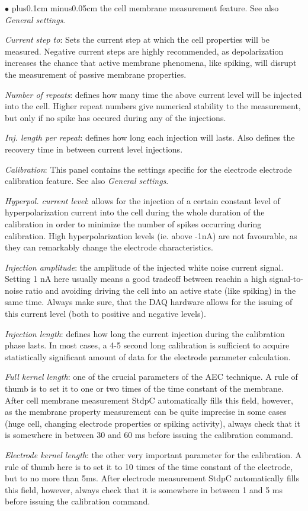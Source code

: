 \documentclass{article}
\newenvironment{myitem}{\begin{list}{$\bullet$}{\setlength{\leftmargin}{1.1em}
\itemsep0.1cm plus0.1cm minus0.05cm
\listparindent0cm
\addtolength{\labelsep}{0.5\labelsep}
\setlength{\labelwidth}{0.8em}
\setlength{\leftmargin}{\labelwidth}
\addtolength{\leftmargin}{\labelsep}
}}{\end{list}}
\begin{document}
\begin{myitem}
  the cell membrane measurement feature. See also \emph{General settings}. 
\item \emph{Current step to}: Sets the current step at which the cell
  properties will be measured. Negative current steps are highly
  recommended, as depolarization increases the chance that active membrane
  phenomena, like spiking, will disrupt the measurement of passive membrane
  properties. 
\item \emph{Number of repeats}: defines how many time the above current level
  will be injected into the cell. Higher repeat numbers give numerical
  stability to the measurement, but only if no spike has occured during any
  of the injections. 
\item \emph{Inj. length per repeat}: defines how long each injection will
  lasts. Also defines the recovery time in between current level injections. 
\item \emph{Calibration}: This panel contains the settings specific for
  the electrode electrode calibration feature. See also \emph{General
    settings}.
\item \emph{Hyperpol. current level}: allows for the injection of a certain
  constant level of  hyperpolarization current into the cell during the
  whole duration of the calibration in order to minimize the number of
  spikes occurring during calibration. High hyperpolarization levels
  (ie. above -1nA) are not favourable, as they can remarkably change the electrode 
  characteristics.
\item \emph{Injection amplitude}: the amplitude of the injected
  white noise current signal. Setting 1 nA here usually means a good
  tradeoff between reachin a high signal-to-noise ratio and avoiding
  driving the cell into 
  an active state (like spiking) in the same time. Always make sure, that
  the DAQ hardware allows for the issuing of this current level (both to
  positive and negative levels).
\item \emph{Injection length}: defines how long the current injection during
  the calibration phase lasts. In most cases, a 4-5 second long calibration
  is sufficient to acquire statistically significant amount of data for the
  electrode parameter calculation.   
\item \emph{Full kernel length}: one of the crucial parameters of the AEC
  technique. A rule of thumb is to set it to one or two times of the time constant of
  the membrane. After cell membrane measurement StdpC automatically
  fills this field, however, as the membrane property measurement can be
  quite imprecise in some cases (huge cell, changing electrode properties
  or spiking activity), always check that it is somewhere in between 30 and
  60 ms before issuing the calibration command.
\item \emph{Electrode kernel length}: the other very important parameter for
  the calibration. A rule of thumb here is to set it to 10 times of the
  time constant of the electrode, but to no more than 5ms. After electrode
  measurement StdpC automatically fills this field, however, always
  check that it is somewhere in between 1 and 5 ms before issuing the
  calibration command.
\end{myitem}
\end{document}
